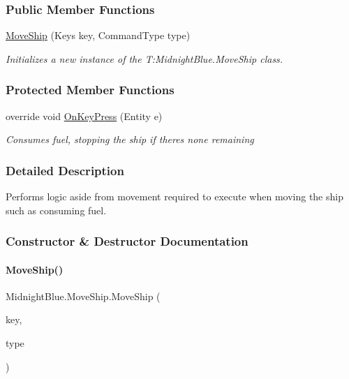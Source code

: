 \subsubsection*{Public Member Functions}
\begin{DoxyCompactItemize}
\item 
\hyperlink{class_midnight_blue_1_1_move_ship_a7c3de7f43d19cde694040c71a5ee5fa0}{Move\+Ship} (Keys key, Command\+Type type)
\begin{DoxyCompactList}\small\item\em Initializes a new instance of the T\+:\+Midnight\+Blue.\+Move\+Ship class. \end{DoxyCompactList}\end{DoxyCompactItemize}
\subsubsection*{Protected Member Functions}
\begin{DoxyCompactItemize}
\item 
override void \hyperlink{class_midnight_blue_1_1_move_ship_ac4b3dcb62954548f27bad5e5d6a00cdf}{On\+Key\+Press} (Entity e)
\begin{DoxyCompactList}\small\item\em Consumes fuel, stopping the ship if there\textquotesingle{}s none remaining \end{DoxyCompactList}\end{DoxyCompactItemize}


\subsubsection{Detailed Description}
Performs logic aside from movement required to execute when moving the ship such as consuming fuel. 



\subsubsection{Constructor \& Destructor Documentation}
\hypertarget{class_midnight_blue_1_1_move_ship_a7c3de7f43d19cde694040c71a5ee5fa0}{}\label{class_midnight_blue_1_1_move_ship_a7c3de7f43d19cde694040c71a5ee5fa0} 
\paragraph{\texorpdfstring{Move\+Ship()}{MoveShip()}}
{\footnotesize\ttfamily Midnight\+Blue.\+Move\+Ship.\+Move\+Ship (\begin{DoxyParamCaption}\item[{Keys}]{key,  }\item[{Command\+Type}]{type }\end{DoxyParamCaption})\hspace{0.3cm}{\ttfamily [inline]}}



